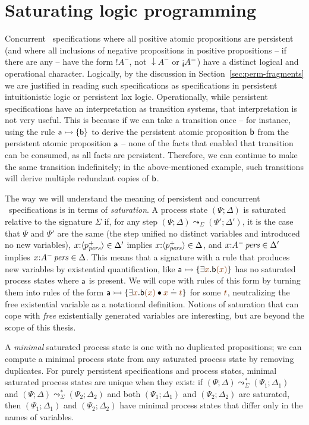 \section{Saturating logic programming}

Concurrent \sls~specifications where all positive atomic propositions
are persistent (and where all inclusions of negative propositions in
positive propositions -- if there are any -- have the form ${!}A^-$, not
${\downarrow}A^-$ or ${\gnab}A^-$) have a distinct logical and
operational character. Logically, by the discussion in
Section~\ref{sec:perm-fragments} we are justified in reading such
specifications as specifications in persistent intuitionistic logic or
persistent lax logic. Operationally, while persistent specifications
have an interpretation as transition systems, that interpretation is
not very useful. This is because if we can take a transition once --
for instance, using the rule ${\sf a} \rightarrowtail \{ {\sf b} \}$ to derive
the persistent atomic proposition ${\sf b}$ from the persistent atomic
proposition ${\sf a}$ -- none of the facts that enabled that
transition can be consumed, as all facts are persistent. Therefore, we
can continue to make the same transition indefinitely; in the
above-mentioned example, such transitions will derive multiple
redundant copies of ${\sf b}$.

The way we will understand the meaning of persistent and concurrent
\sls~specifications is in terms of {\it saturation}. A process state
$(\Psi; \Delta)$ is saturated relative to the signature $\Sigma$ if,
for any step $(\Psi; \Delta) \leadsto_\Sigma (\Psi'; \Delta')$, it is
the case that $\Psi$ and $\Psi'$ are the same (the step unified no
distinct variables and introduced no new variables),
$x{:}\langle {p^+_{\it pers}} \rangle \in \Delta'$ implies $x{:}\langle {p^+_{\it pers}} \rangle \in
\Delta$, and $x{:}{A^-}\,{{\it pers}} \in \Delta'$ implies $x{:}{A^-}\,{{\it pers}}
\in \Delta$. This means that a signature with a rule that produces new
variables by existential quantification, like ${\sf a} \lefti \{
\exists \lf{x}. {\sf b}\lf{(x)} \}$ has no saturated process states
where ${\sf a}$ is present. We will cope with rules of this form by
turning them into rules of the form ${\sf a} \lefti \{ \exists
\lf{x}. {\sf b}\lf{(x)} \fuse \lf{x} \doteq \lf{t} \}$ for some
$\lf{t}$, neutralizing the free existential variable as a notational
definition. Notions of saturation that can cope with {\it free}
existentially generated variables are interesting, but are beyond the
scope of this thesis.

A {\it minimal} saturated process state is one with no duplicated
propositions; we can compute a minimal process state from any
saturated process state by removing duplicates. For purely persistent
specifications and process states, minimal saturated process states
are unique when they exist: if $(\Psi; \Delta) \leadsto^*_\Sigma
(\Psi_1; \Delta_1)$ and $(\Psi; \Delta) \leadsto^*_\Sigma (\Psi_2;
\Delta_2)$ and both $(\Psi_1; \Delta_1)$ and $(\Psi_2; \Delta_2)$ are
saturated, then $(\Psi_1; \Delta_1)$ and $(\Psi_2; \Delta_2)$ have
minimal process states that differ only in the names of variables.

